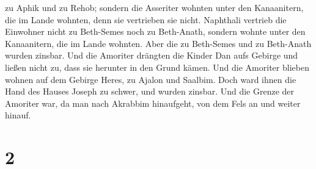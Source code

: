 zu Aphik und zu Rehob;  sondern die Asseriter wohnten
unter den Kanaanitern, die im Lande wohnten, denn sie vertrieben sie
nicht.  Naphthali vertrieb die Einwohner nicht zu
Beth-Semes noch zu Beth-Anath, sondern wohnte unter den Kanaanitern, die
im Lande wohnten. Aber die zu Beth-Semes und zu Beth-Anath wurden
zinsbar.  Und die Amoriter drängten die Kinder Dan aufs
Gebirge und ließen nicht zu, dass sie herunter in den Grund kämen.
 Und die Amoriter blieben wohnen auf dem Gebirge Heres,
zu Ajalon und Saalbim. Doch ward ihnen die Hand des Hauses Joseph zu
schwer, und wurden zinsbar.  Und die Grenze der Amoriter
war, da man nach Akrabbim hinaufgeht, von dem Fels an und weiter hinauf.

\hypertarget{section-1}{%
\section{2}\label{section-1}}

